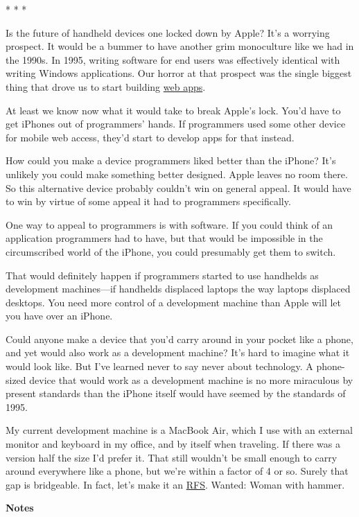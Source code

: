 * * *

Is the future of handheld devices one locked down by Apple? It's a
worrying prospect. It would be a bummer to have another grim monoculture
like we had in the 1990s. In 1995, writing software for end users was
effectively identical with writing Windows applications. Our horror at
that prospect was the single biggest thing that drove us to start
building \href{road.html}{web apps}.

At least we know now what it would take to break Apple's lock. You'd
have to get iPhones out of programmers' hands. If programmers used some
other device for mobile web access, they'd start to develop apps for
that instead.

How could you make a device programmers liked better than the iPhone?
It's unlikely you could make something better designed. Apple leaves no
room there. So this alternative device probably couldn't win on general
appeal. It would have to win by virtue of some appeal it had to
programmers specifically.

One way to appeal to programmers is with software. If you could think of
an application programmers had to have, but that would be impossible in
the circumscribed world of the iPhone, you could presumably get them to
switch.

That would definitely happen if programmers started to use handhelds as
development machines---if handhelds displaced laptops the way laptops
displaced desktops. You need more control of a development machine than
Apple will let you have over an iPhone.

Could anyone make a device that you'd carry around in your pocket like a
phone, and yet would also work as a development machine? It's hard to
imagine what it would look like. But I've learned never to say never
about technology. A phone-sized device that would work as a development
machine is no more miraculous by present standards than the iPhone
itself would have seemed by the standards of 1995.

My current development machine is a MacBook Air, which I use with an
external monitor and keyboard in my office, and by itself when
traveling. If there was a version half the size I'd prefer it. That
still wouldn't be small enough to carry around everywhere like a phone,
but we're within a factor of 4 or so. Surely that gap is bridgeable. In
fact, let's make it an \href{http://ycombinator.com/rfs5.html}{RFS}.
Wanted: Woman with hammer.

\textbf{Notes}

